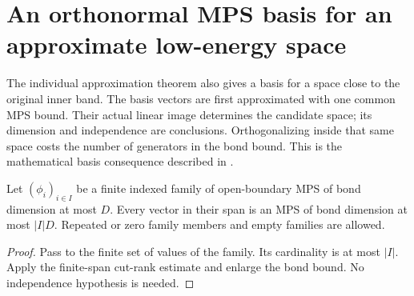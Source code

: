 \section{An orthonormal MPS basis for an approximate low-energy space}

The individual approximation theorem also gives a basis for a space close
to the original inner band. The basis vectors are first approximated with
one common MPS bound. Their actual linear image determines the candidate
space; its dimension and independence are conclusions. Orthogonalizing
inside that same space costs the number of generators in the bond bound.
This is the mathematical basis consequence described in
\cite[line 288 and Theorem~thm:al-ld, lines 1096--1105]{Arad2016RigorousRG}.

\begin{lemma}
    \label{lem:mps_indexed_family_span}
    \leanok
    Let $(\phi_i)_{i\in I}$ be a finite indexed family of open-boundary
    MPS of bond dimension at most $D$. Every vector in their span is
    an MPS of bond dimension at most $|I|D$.
    Repeated or zero family members and empty families are allowed.
\end{lemma}
\begin{proof}\leanok
    Pass to the finite set of values of the family. Its cardinality is
    at most $|I|$. Apply the finite-span cut-rank estimate and enlarge
    the bond bound. No independence hypothesis is needed.
\end{proof}

